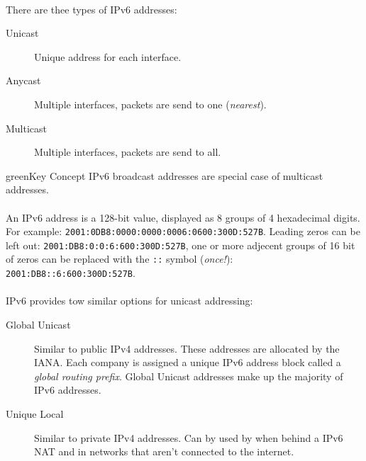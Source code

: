 \documentclass[10pt,landscape]{article}
\begin{document}
\begin{multicols}{3}
\begin{itemize}
\paragraph{}
There are thee types of IPv6 addresses:
\begin{description}
	\item[Unicast] Unique address for each interface.
	\item[Anycast] Multiple interfaces, packets are send to one (\textit{nearest}).
	\item[Multicast] Multiple interfaces, packets are send to all.
\end{description}
\begin{textbox}{green}{Key Concept}
	IPv6 broadcast addresses are special case of multicast addresses.
\end{textbox}
\paragraph{}
An IPv6 address is a 128-bit value, displayed as 8 groups of 4 hexadecimal digits.
For example: \verb!2001:0DB8:0000:0000:0006:0600:300D:527B!.
Leading zeros can be left out: \verb!2001:DB8:0:0:6:600:300D:527B!, one or more adjecent groups
of 16 bit of zeros can be replaced with the \verb!::! symbol (\textit{once!}): \verb!2001:DB8::6:600:300D:527B!.
\paragraph{}
IPv6 provides tow similar options for unicast addressing:
\begin{description}
	\item[Global Unicast] Similar to public IPv4 addresses. These addresses are allocated by the IANA. Each company is assigned a unique IPv6 address block called a \textit{global routing prefix}. Global Unicast addresses make up the majority of IPv6 addresses.
	\item[Unique Local] Similar to private IPv4 addresses. Can by used by when behind a IPv6 NAT and in networks that aren't connected to the internet.
\end{description}

\end{itemize}
\end{multicols}
\end{document}

